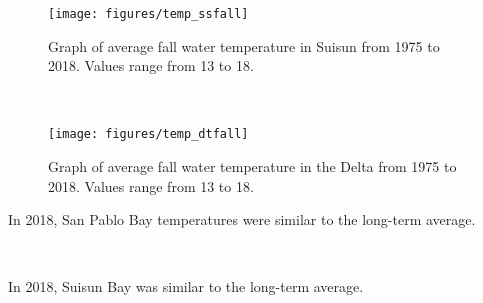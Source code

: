\documentclass[
]{book}
\begin{document}
\begin{panel-grid}
\begin{columns-nocenter}
\begin{column800}

\begin{expand}

\begin{figure}
\texttt{[image: figures/temp\_ssfall]} \caption{Graph of average fall water temperature in Suisun from 1975 to 2018. Values range from 13 to 18.}\label{fig:unnamed-chunk-103}
\end{figure}

\end{expand}

\end{column800}

\begin{column40}

~

\end{column40}

\begin{column800}

\begin{expand}

\begin{figure}
\texttt{[image: figures/temp\_dtfall]} \caption{Graph of average fall water temperature in the Delta from 1975 to 2018. Values range from 13 to 18.}\label{fig:unnamed-chunk-104}
\end{figure}

\end{expand}

\end{column800}

\end{columns-nocenter}

\begin{columns-nocenter}

\begin{column800}

In 2018, San Pablo Bay temperatures were similar to the long-term average.

\end{column800}

\begin{column40}

~

\end{column40}

\begin{column800}

In 2018, Suisun Bay was similar to the long-term average.


\end{column800}
\end{columns-nocenter}
\end{panel-grid}
\end{document}
